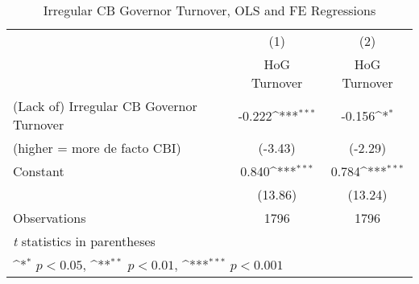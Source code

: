 \begin{table}[htbp]\centering
\def\sym#1{\ifmmode^{#1}\else\(^{#1}\)\fi}
\caption{Irregular CB Governor Turnover, OLS and FE Regressions \label{irregtdHOGalone}}
\begin{tabular}{l*{2}{c}}
\toprule
                                        &\multicolumn{1}{c}{(1)}&\multicolumn{1}{c}{(2)}\\
                                        &\multicolumn{1}{c}{HoG Turnover}&\multicolumn{1}{c}{HoG Turnover}\\
\midrule
(Lack of) Irregular CB Governor Turnover&   -0.222\sym{***}&   -0.156\sym{*}  \\
(higher = more de facto CBI)            &  (-3.43)         &  (-2.29)         \\
\addlinespace
Constant                                &    0.840\sym{***}&    0.784\sym{***}\\
                                        &  (13.86)         &  (13.24)         \\
\midrule
Observations                            &     1796         &     1796         \\
\bottomrule
\multicolumn{3}{l}{\footnotesize \textit{t} statistics in parentheses}\\
\multicolumn{3}{l}{\footnotesize \sym{*} \(p<0.05\), \sym{**} \(p<0.01\), \sym{***} \(p<0.001\)}\\
\end{tabular}
\end{table}

